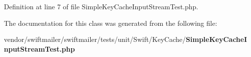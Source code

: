 Definition at line 7 of file Simple\+Key\+Cache\+Input\+Stream\+Test.\+php.



The documentation for this class was generated from the following file\+:\begin{DoxyCompactItemize}
\item 
vendor/swiftmailer/swiftmailer/tests/unit/\+Swift/\+Key\+Cache/{\bf Simple\+Key\+Cache\+Input\+Stream\+Test.\+php}\end{DoxyCompactItemize}
